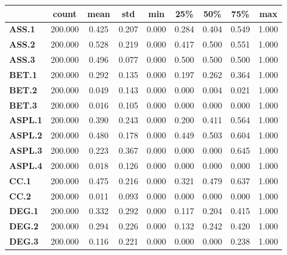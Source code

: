 \documentclass[
	article,			%
	11pt,				%
	oneside,			%
	a4paper,			%
	english,			%
	brazil,				%
	sumario=tradicional
	]{abntex2}
\begin{document}
\newpage
\begin{table}[h!]
\centering
\begin{tabular}{l|c|c|c|c|c|c|c|c|}
\cline{2-9}
                                      & count   & mean  & std   & min   & 25\%  & 50\%  & 75\%  & max   \\ \hline
\multicolumn{1}{|l|}{\textbf{ASS.1}}  & 200.000 & 0.425 & 0.207 & 0.000 & 0.284 & 0.404 & 0.549 & 1.000 \\ \hline
\multicolumn{1}{|l|}{\textbf{ASS.2}}  & 200.000 & 0.528 & 0.219 & 0.000 & 0.417 & 0.500 & 0.551 & 1.000 \\ \hline
\multicolumn{1}{|l|}{\textbf{ASS.3}}  & 200.000 & 0.496 & 0.077 & 0.000 & 0.500 & 0.500 & 0.500 & 1.000 \\ \hline
\multicolumn{1}{|l|}{\textbf{BET.1}}  & 200.000 & 0.292 & 0.135 & 0.000 & 0.197 & 0.262 & 0.364 & 1.000 \\ \hline
\multicolumn{1}{|l|}{\textbf{BET.2}}  & 200.000 & 0.049 & 0.143 & 0.000 & 0.000 & 0.004 & 0.021 & 1.000 \\ \hline
\multicolumn{1}{|l|}{\textbf{BET.3}}  & 200.000 & 0.016 & 0.105 & 0.000 & 0.000 & 0.000 & 0.000 & 1.000 \\ \hline
\multicolumn{1}{|l|}{\textbf{ASPL.1}} & 200.000 & 0.390 & 0.243 & 0.000 & 0.200 & 0.411 & 0.564 & 1.000 \\ \hline
\multicolumn{1}{|l|}{\textbf{ASPL.2}} & 200.000 & 0.480 & 0.178 & 0.000 & 0.449 & 0.503 & 0.604 & 1.000 \\ \hline
\multicolumn{1}{|l|}{\textbf{ASPL.3}} & 200.000 & 0.223 & 0.367 & 0.000 & 0.000 & 0.000 & 0.645 & 1.000 \\ \hline
\multicolumn{1}{|l|}{\textbf{ASPL.4}} & 200.000 & 0.018 & 0.126 & 0.000 & 0.000 & 0.000 & 0.000 & 1.000 \\ \hline
\multicolumn{1}{|l|}{\textbf{CC.1}}   & 200.000 & 0.475 & 0.216 & 0.000 & 0.321 & 0.479 & 0.637 & 1.000 \\ \hline
\multicolumn{1}{|l|}{\textbf{CC.2}}   & 200.000 & 0.011 & 0.093 & 0.000 & 0.000 & 0.000 & 0.000 & 1.000 \\ \hline
\multicolumn{1}{|l|}{\textbf{DEG.1}}  & 200.000 & 0.332 & 0.292 & 0.000 & 0.117 & 0.204 & 0.415 & 1.000 \\ \hline
\multicolumn{1}{|l|}{\textbf{DEG.2}}  & 200.000 & 0.294 & 0.226 & 0.000 & 0.132 & 0.242 & 0.420 & 1.000 \\ \hline
\multicolumn{1}{|l|}{\textbf{DEG.3}}  & 200.000 & 0.116 & 0.221 & 0.000 & 0.000 & 0.000 & 0.238 & 1.000 \\ \hline

\end{tabular}
\end{table}
\end{document}
